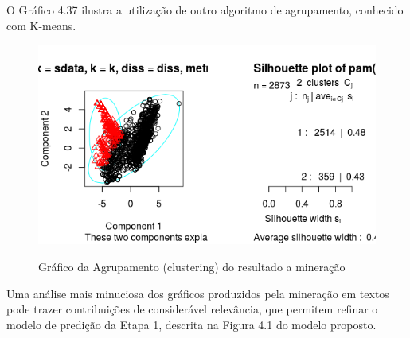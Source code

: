 \pagebreak
\vspace{15mm}


O Gráfico 4.37 ilustra a utilização de outro algoritmo de agrupamento, conhecido com K-means. 

\begin{figure}[!ht]
	\centering
	\caption{Gráfico da Agrupamento (clustering) do resultado a mineração}
	\includegraphics[width=0.9\linewidth]{Figuras/Twitter/Cluster2}
	\label{fig:Cluster2}
\end{figure}


Uma análise mais minuciosa dos gráficos produzidos pela mineração em textos pode trazer contribuições de considerável relevância, que permitem refinar o modelo de predição da Etapa 1, descrita na Figura 4.1 do modelo proposto.

